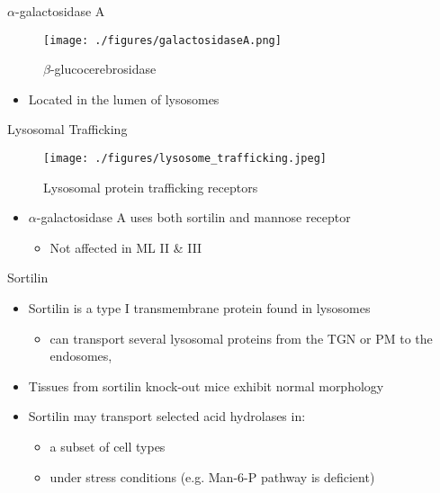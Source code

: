 \documentclass[presentation, smaller]{beamer}
\begin{document}
\begin{frame}[label={sec:orgheadline4}]{\(\alpha\)-galactosidase A}
\begin{figure}[htb]
\centering
\texttt{[image: ./figures/galactosidaseA.png]}
\caption[block]{\label{fig:sidase}
\(\beta\)-glucocerebrosidase}
\end{figure}

\begin{itemize}
\item Located in the lumen of lysosomes
\end{itemize}
\end{frame}

\begin{frame}[label={sec:orgheadline5}]{Lysosomal Trafficking}
\begin{figure}[htb]
\centering
\texttt{[image: ./figures/lysosome\_trafficking.jpeg]}
\caption[traf]{\label{fig:traf}
Lysosomal protein trafficking receptors}
\end{figure}
\begin{itemize}
\item \(\alpha\)-galactosidase A uses both sortilin and mannose receptor
\begin{itemize}
\item Not affected in ML II \& III
\end{itemize}
\end{itemize}
\end{frame}

\begin{frame}[label={sec:orgheadline6}]{Sortilin}
\begin{itemize}
\item Sortilin is a type I transmembrane protein found in lysosomes
\begin{itemize}
\item can transport several lysosomal proteins from the TGN or PM to the endosomes,
\end{itemize}
\item Tissues from sortilin knock-out mice exhibit normal morphology
\item Sortilin may transport selected acid hydrolases in:
\begin{itemize}
\item a subset of cell types
\item under stress conditions (e.g. Man-6-P pathway is deficient)
\end{itemize}
\end{itemize}
\end{frame}
\end{document}
